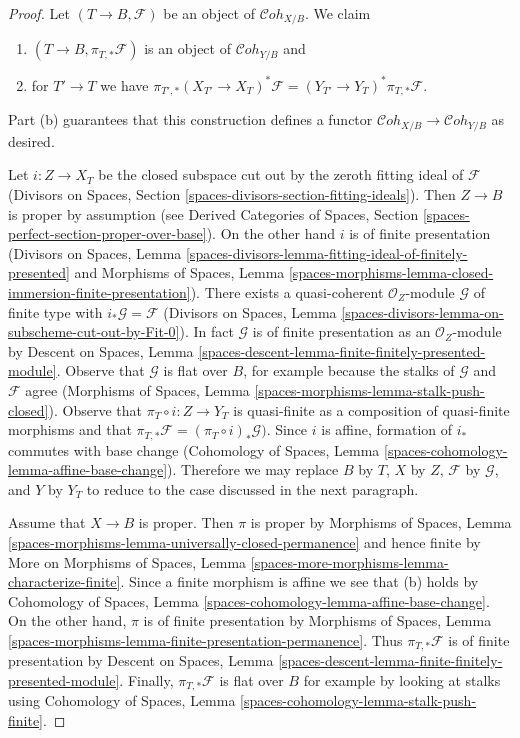 \documentclass{stacks-project}
\theoremstyle{plain}
\theoremstyle{definition}
\theoremstyle{remark}
\numberwithin{equation}{subsection}
\def\Cohstack{\mathcal{C}\!\mathit{oh}}
\begin{document}
\begin{proof}
Let $(T \to B, \mathcal{F})$ be an object of $\Cohstack_{X/B}$.
We claim
\begin{enumerate}
\item[(a)] $(T \to B, \pi_{T, *}\mathcal{F})$ is an object
of $\Cohstack_{Y/B}$ and
\item[(b)] for $T' \to T$ we have
$\pi_{T', *}(X_{T'} \to X_T)^*\mathcal{F} =
(Y_{T'} \to Y_T)^*\pi_{T, *}\mathcal{F}$.
\end{enumerate}
Part (b) guarantees that this construction defines a functor
$\Cohstack_{X/B} \to \Cohstack_{Y/B}$ as desired.

\medskip\noindent
Let $i : Z \to X_T$ be the closed subspace cut out by the zeroth
fitting ideal of $\mathcal{F}$
(Divisors on Spaces, Section
\ref{spaces-divisors-section-fitting-ideals}).
Then $Z \to B$ is proper by assumption (see
Derived Categories of Spaces, Section
\ref{spaces-perfect-section-proper-over-base}).
On the other hand $i$ is of finite presentation
(Divisors on Spaces, Lemma
\ref{spaces-divisors-lemma-fitting-ideal-of-finitely-presented} and
Morphisms of Spaces, Lemma
\ref{spaces-morphisms-lemma-closed-immersion-finite-presentation}).
There exists a quasi-coherent $\mathcal{O}_Z$-module
$\mathcal{G}$ of finite type with $i_*\mathcal{G} = \mathcal{F}$
(Divisors on Spaces, Lemma
\ref{spaces-divisors-lemma-on-subscheme-cut-out-by-Fit-0}).
In fact $\mathcal{G}$ is of finite presentation as an $\mathcal{O}_Z$-module
by Descent on Spaces, Lemma
\ref{spaces-descent-lemma-finite-finitely-presented-module}.
Observe that $\mathcal{G}$ is flat over $B$, for example
because the stalks of $\mathcal{G}$ and $\mathcal{F}$ agree
(Morphisms of Spaces, Lemma \ref{spaces-morphisms-lemma-stalk-push-closed}).
Observe that $\pi_T \circ i : Z \to Y_T$ is quasi-finite as a composition
of quasi-finite morphisms and that
$\pi_{T, *}\mathcal{F} = (\pi_T \circ i)_*\mathcal{G})$.
Since $i$ is affine, formation of $i_*$ commutes with base change
(Cohomology of Spaces, Lemma \ref{spaces-cohomology-lemma-affine-base-change}).
Therefore we may replace $B$ by $T$, $X$ by $Z$,
$\mathcal{F}$ by $\mathcal{G}$, and $Y$ by $Y_T$
to reduce to the case discussed in the next paragraph.

\medskip\noindent
Assume that $X \to B$ is proper. Then $\pi$ is proper
by Morphisms of Spaces, Lemma
\ref{spaces-morphisms-lemma-universally-closed-permanence}
and hence finite by
More on Morphisms of Spaces,
Lemma \ref{spaces-more-morphisms-lemma-characterize-finite}.
Since a finite morphism is affine we see that (b) holds by
Cohomology of Spaces, Lemma \ref{spaces-cohomology-lemma-affine-base-change}.
On the other hand, $\pi$ is of finite presentation by
Morphisms of Spaces, Lemma
\ref{spaces-morphisms-lemma-finite-presentation-permanence}.
Thus $\pi_{T, *}\mathcal{F}$ is of finite presentation by
Descent on Spaces, Lemma
\ref{spaces-descent-lemma-finite-finitely-presented-module}.
Finally, $\pi_{T, *}\mathcal{F} $ is flat over $B$ for example
by looking at stalks using
Cohomology of Spaces, Lemma \ref{spaces-cohomology-lemma-stalk-push-finite}.
\end{proof}
\end{document}
